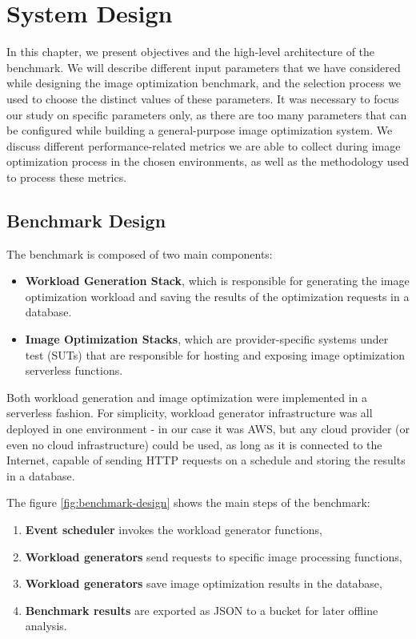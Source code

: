 \section{System Design}
\label{cha:system-design}

In this chapter, we present objectives and the high-level architecture of the benchmark. We will describe different input parameters that we have considered while designing the image optimization benchmark, and the selection process we used to choose the distinct values of these parameters. It was necessary to focus our study on specific parameters only, as there are too many parameters that can be configured while building a general-purpose image optimization system. We discuss different performance-related metrics we are able to collect during image optimization process in the chosen environments, as well as the methodology used to process these metrics.

\subsection{Benchmark Design}

The benchmark is composed of two main components:
\begin{itemize}
  \item \textbf{Workload Generation Stack}, which is responsible for generating the image optimization workload and saving the results of the optimization requests in a database. 
  \item \textbf{Image Optimization Stacks}, which are provider-specific systems under test (SUTs) that are responsible for hosting and exposing image optimization serverless functions.
\end{itemize}

Both workload generation and image optimization were implemented in a serverless fashion. For simplicity, workload generator infrastructure was all deployed in one environment - in our case it was AWS, but any cloud provider (or even no cloud infrastructure) could be used, as long as it is connected to the Internet, capable of sending HTTP requests on a schedule and storing the results in a database.

The figure \ref{fig:benchmark-design} shows the main steps of the benchmark:
\begin{enumerate}
  \item \textbf{Event scheduler} invokes the workload generator functions,
  \item \textbf{Workload generators} send requests to specific image processing functions,
  \item \textbf{Workload generators} save image optimization results in the database,
  \item \textbf{Benchmark results} are exported as JSON to a bucket for later offline analysis.
\end{enumerate}

